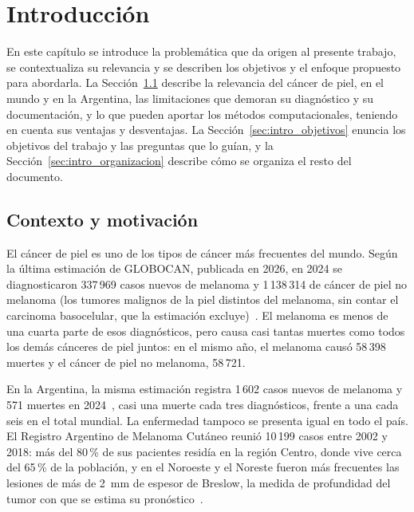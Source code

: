 \chapter[Introducción]{Introducción}
\label{cp:introduccion}

En este capítulo se introduce la problemática que da origen al presente trabajo, se contextualiza su relevancia
y se describen los objetivos y el enfoque propuesto para abordarla. La Sección~\ref{sec:intro_contexto}
describe la relevancia del cáncer de piel, en el mundo y en la Argentina, las limitaciones que demoran su
diagnóstico y su documentación, y lo que pueden aportar los métodos computacionales, teniendo en cuenta sus
ventajas y desventajas. La Sección~\ref{sec:intro_objetivos} enuncia los objetivos del trabajo y las preguntas
que lo guían, y la Sección~\ref{sec:intro_organizacion} describe cómo se organiza el resto del documento.

\section{Contexto y motivación}
\label{sec:intro_contexto}

El cáncer de piel es uno de los tipos de cáncer más frecuentes del mundo. Según la última estimación de
GLOBOCAN, publicada en 2026, en 2024 se diagnosticaron 337\,969 casos nuevos de melanoma y 1\,138\,314 de
cáncer de piel no melanoma (los tumores malignos de la piel distintos del melanoma, sin contar el carcinoma
basocelular, que la estimación excluye)~\cite{sung2026global}. El melanoma es menos de una cuarta parte de esos
diagnósticos, pero causa casi tantas muertes como todos los demás cánceres de piel juntos: en el mismo año, el
melanoma causó 58\,398 muertes y el cáncer de piel no melanoma, 58\,721.

En la Argentina, la misma estimación registra 1\,602 casos nuevos de melanoma y 571 muertes en
2024~\cite{ervik2026cancertoday}, casi una muerte cada tres diagnósticos, frente a una cada seis en el total
mundial. La enfermedad tampoco se presenta igual en todo el país. El Registro Argentino de Melanoma Cutáneo
reunió 10\,199 casos entre 2002 y 2018: más del 80\,\% de sus pacientes residía en la región Centro, donde vive
cerca del 65\,\% de la población, y en el Noroeste y el Noreste fueron más frecuentes las lesiones de más de
2~mm de espesor de Breslow, la medida de profundidad del tumor con que se estima su
pronóstico~\cite{loria2020cutaneous}.

